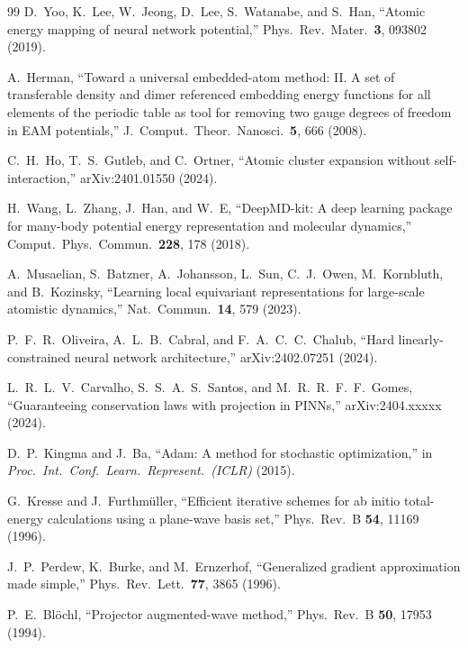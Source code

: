 \documentclass[twoside,prb,aps,floatfix,superscriptaddress,longbibliography]{revtex4-2}
\begin{document}
\begin{thebibliography}{99}
D.~Yoo, K.~Lee, W.~Jeong, D.~Lee, S.~Watanabe, and S.~Han, ``Atomic energy mapping of neural network potential,'' Phys.\ Rev.\ Mater.\ \textbf{3}, 093802 (2019).

A.~Herman, ``Toward a universal embedded-atom method: II. A set of transferable density and dimer referenced embedding energy functions for all elements of the periodic table as tool for removing two gauge degrees of freedom in EAM potentials,'' J.\ Comput.\ Theor.\ Nanosci.\ \textbf{5}, 666 (2008).

C.~H.~Ho, T.~S.~Gutleb, and C.~Ortner, ``Atomic cluster expansion without self-interaction,'' arXiv:2401.01550 (2024).

H.~Wang, L.~Zhang, J.~Han, and W.~E, ``DeepMD-kit: A deep learning package for many-body potential energy representation and molecular dynamics,'' Comput.\ Phys.\ Commun.\ \textbf{228}, 178 (2018).

A.~Musaelian, S.~Batzner, A.~Johansson, L.~Sun, C.~J.~Owen, M.~Kornbluth, and B.~Kozinsky, ``Learning local equivariant representations for large-scale atomistic dynamics,'' Nat.\ Commun.\ \textbf{14}, 579 (2023).

P.~F.~R.~Oliveira, A.~L.~B.~Cabral, and F.~A.~C.~C.~Chalub, ``Hard linearly-constrained neural network architecture,'' arXiv:2402.07251 (2024).

L.~R.~L.~V.~Carvalho, S.~S.~A.~S.~Santos, and M.~R.~R.~F.~F.~Gomes, ``Guaranteeing conservation laws with projection in PINNs,'' arXiv:2404.xxxxx (2024).

D.~P.~Kingma and J.~Ba, ``Adam: A method for stochastic optimization,'' in \textit{Proc.\ Int.\ Conf.\ Learn.\ Represent.\ (ICLR)} (2015).

G.~Kresse and J.~Furthm\"{u}ller, ``Efficient iterative schemes for ab initio total-energy calculations using a plane-wave basis set,'' Phys.\ Rev.\ B \textbf{54}, 11169 (1996).

J.~P.~Perdew, K.~Burke, and M.~Ernzerhof, ``Generalized gradient approximation made simple,'' Phys.\ Rev.\ Lett.\ \textbf{77}, 3865 (1996).

P.~E.~Bl\"{o}chl, ``Projector augmented-wave method,'' Phys.\ Rev.\ B \textbf{50}, 17953 (1994).

\end{thebibliography}
\end{document}
